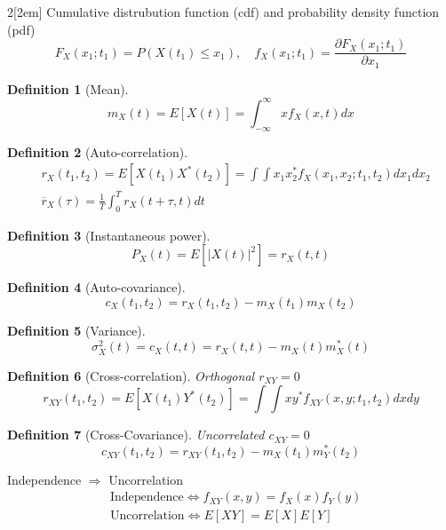 \documentclass{myclass}
\newtheorem*{definition}{Definition}
\begin{document}
\begin{multicols}{2}[\columnsep2em]
Cumulative distrubution function (cdf) and probability density function (pdf)
\[
F_X(x_1;t_1) = P(X(t_1)\le x_1), \quad f_X(x_1;t_1) = \frac{\partial F_X(x_1; t_1)}{\partial x_1}
\] 

\begin{definition}[Mean]
\[
m_X(t) = E[X(t)] = \int_{-\infty}^\infty xf_X(x, t)dx
\] 
\end{definition}

\begin{definition}[Auto-correlation]
\begin{align*}
  & r_X(t_1, t_2) = E[X(t_1)X^*(t_2)] = \int \int x_1x_2^* f_X(x_1, x_2; t_1, t_2)dx_1dx_2 \\
  & \overline{r}_{X}(\tau ) = \frac{1}{T} \int_{0}^T r_X(t+\tau ,t) dt
\end{align*}
\end{definition}


\begin{definition}[Instantaneous power]
\[
P_X(t) = E[|X(t)|^2] = r_X(t,t)
\] 
\end{definition}

\begin{definition}[Auto-covariance]
\[
c_X(t_1, t_2) = r_X(t_1, t_2) - m_X(t_1)m_X(t_2)
\] 
\end{definition}

\begin{definition}[Variance]
\[
\sigma^2_{X}(t) = c_X(t,t) = r_X(t, t) - m_X(t)m_X^*(t)
\] 
\end{definition}

\begin{definition}[Cross-correlation] Orthogonal $ r_{XY} = 0$
\[
r_{XY}(t_1, t_2) = E[X(t_1)Y^*(t_2)]= \int\int xy^*f_{XY}(x, y; t_1, t_2)dxdy
\] 
\end{definition}

\begin{definition}[Cross-Covariance] Uncorrelated $ c_{XY} = 0$
\[
c_{XY}(t_1,t_2) = r_{XY}(t_1,t_2) - m_X(t_1)m_Y^*(t_2)
\] 
\end{definition}

Independence $\Rightarrow$ Uncorrelation
\begin{align*}
  & \text{Independence} \iff f_{XY}(x, y) = f_X(x)f_Y(y) \\
  & \text{Uncorrelation} \iff E[XY] = E[X]E[Y]
\end{align*}


\end{multicols}
\end{document}
